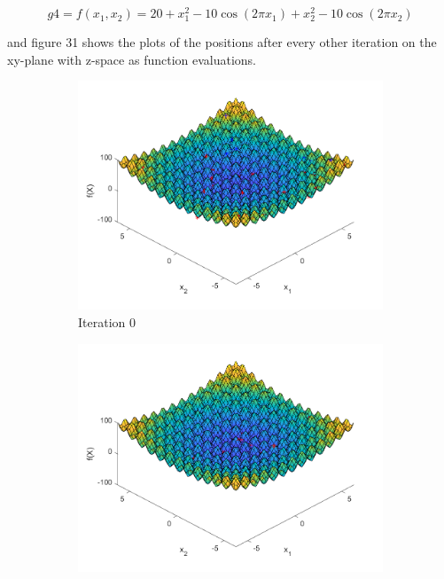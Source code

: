 $$
 g4= f(x_1, x_2) = 20 + x_1^2 - 10 \cos(2\pi x_1) + x_2^2 - 10 \cos(2\pi x_2)
$$

and figure 31 shows the plots of the positions after every other iteration on the xy-plane with z-space as function evaluations.

\begin{figure}
  \centering
  \begin{subfigure}[b]{0.4\textwidth}
    \includegraphics[width=\textwidth]{img/smpl/rast2d/loa-iter-0}
    \caption{Iteration 0}
    \label{fig:s4-iter-0}
  \end{subfigure}
  \begin{subfigure}[b]{0.4\textwidth}
    \includegraphics[width=\textwidth]{img/smpl/rast2d/loa-iter-7}

\end{subfigure}
\end{figure}
